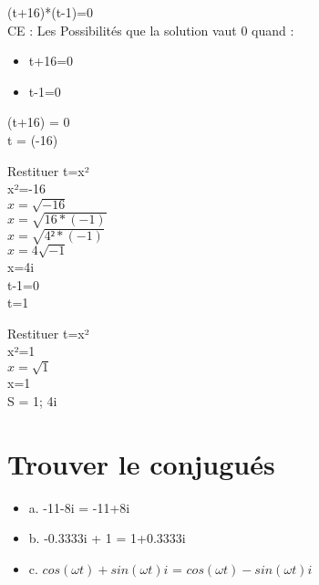 (t+16)*(t-1)=0 \\


CE : Les Possibilités que la solution vaut 0 quand :

\begin{itemize}
\item {t+16=0}
\item {t-1=0}
\end{itemize}

(t+16) = 0 \\

t = (-16) \\

\vspace{5mm}

Restituer t=x² \\

x²=-16 \\

$x=\sqrt{-16}$ \\

$x=\sqrt{16 * (-1)}$ \\

$x=\sqrt{4² * (-1)}$ \\

$x=4\sqrt{-1}$ \\

x=4i \\

t-1=0 \\
t=1 \\

\vspace{5mm}

Restituer t=x² \\

x²=1 \\
$x=\sqrt{1}$ \\
x=1 \\

S = 1; 4i \\

\newpage

\section{Trouver le conjugués}

\begin{itemize}
\item {a. -11-8i = -11+8i}
\item {b. -0.3333i + 1 = 1+0.3333i}
\item {c. $cos(\omega t) + sin(\omega t)i$ = $cos(\omega t) - sin(\omega t)i$ }
\end{itemize}

